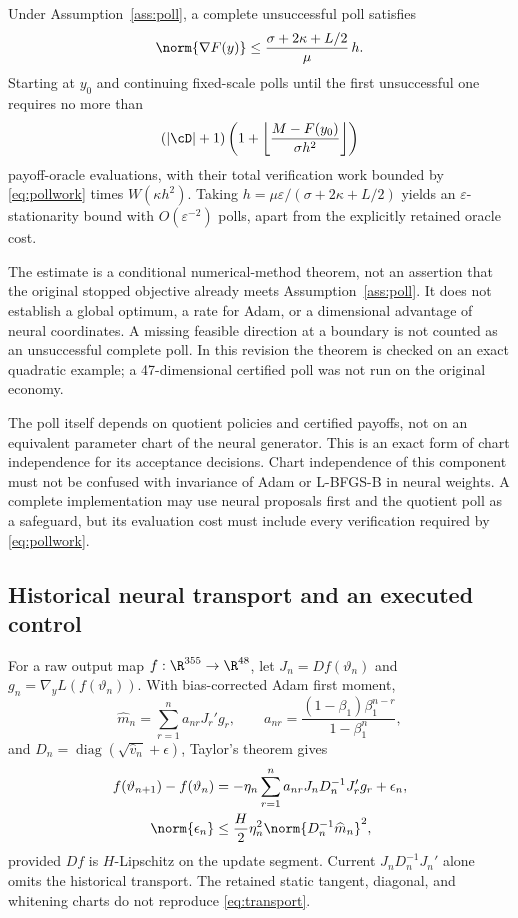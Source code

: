 \begin{theorem}\label{thm:poll}
Under Assumption~\ref{ass:poll}, a complete unsuccessful poll satisfies
\begin{equation}
 \norm{\nabla F(y)}\leq \frac{\sigma+2\kappa+L/2}{\mu}\,h.\label{eq:stationarity}
\end{equation}
Starting at $y_0$ and continuing fixed-scale polls until the first unsuccessful one requires no more than
\begin{equation}
 (|\cD|+1)\left(1+\left\lfloor\frac{M-F(y_0)}{\sigma h^2}\right\rfloor\right)
 \label{eq:pollwork}
\end{equation}
payoff-oracle evaluations, with their total verification work bounded by \eqref{eq:pollwork} times $W(\kappa h^2)$. Taking $h=\mu\varepsilon/(\sigma+2\kappa+L/2)$ yields an $\varepsilon$-stationarity bound with $O(\varepsilon^{-2})$ polls, apart from the explicitly retained oracle cost.
\end{theorem}
The estimate is a conditional numerical-method theorem, not an assertion that the original stopped objective already meets Assumption~\ref{ass:poll}. It does not establish a global optimum, a rate for Adam, or a dimensional advantage of neural coordinates. A missing feasible direction at a boundary is not counted as an unsuccessful complete poll. In this revision the theorem is checked on an exact quadratic example; a 47-dimensional certified poll was not run on the original economy.

The poll itself depends on quotient policies and certified payoffs, not on an equivalent parameter chart of the neural generator. This is an exact form of chart independence for its acceptance decisions. Chart independence of this component must not be confused with invariance of Adam or L-BFGS-B in neural weights. A complete implementation may use neural proposals first and the quotient poll as a safeguard, but its evaluation cost must include every verification required by \eqref{eq:pollwork}.

\subsection{Historical neural transport and an executed control}\label{sec:geometry}
For a raw output map $f:\R^{355}\to\R^{48}$, let $J_n=Df(\vartheta_n)$ and $g_n=\nabla_y L(f(\vartheta_n))$. With bias-corrected Adam first moment,
\[
 \widehat m_n=\sum_{r=1}^n a_{nr}J_r'g_r,\qquad
 a_{nr}=\frac{(1-\beta_1)\beta_1^{n-r}}{1-\beta_1^n},
\]
and $D_n=\operatorname{diag}(\sqrt{\widehat v_n}+\epsilon)$, Taylor's theorem gives
\begin{align}
 f(\vartheta_{n+1})-f(\vartheta_n)
 &=-\eta_n\sum_{r=1}^n a_{nr}J_nD_n^{-1}J_r'g_r+\epsilon_n,\label{eq:transport}\\
 \norm{\epsilon_n}&\leq \frac H2\eta_n^2\norm{D_n^{-1}\widehat m_n}^2,
\end{align}
provided $Df$ is $H$-Lipschitz on the update segment. Current $J_nD_n^{-1}J_n'$ alone omits the historical transport. The retained static tangent, diagonal, and whitening charts do not reproduce \eqref{eq:transport}.

